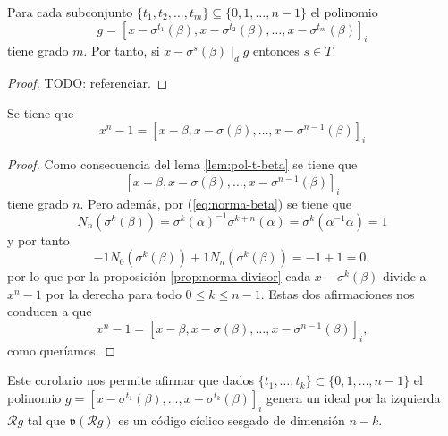 \begin{lemma}
  \label{lem:pol-t-beta}
  Para cada subconjunto \(\{t_1, t_2, \dots, t_m\} \subseteq \{0, 1, \dots, n - 1\}\) el polinomio 
  \[
    g = \left[x - \sigma^{t_1}(\beta), x - \sigma^{t_{2}}(\beta), \dots, x - \sigma^{t_m}(\beta)\right]_{i}
  \]
  tiene grado \(m\).
  Por tanto, si \(x - \sigma^s(\beta) \mid_d g\) entonces \(s \in T\).
\end{lemma}

\begin{proof}
  TODO: referenciar.
\end{proof}

\begin{corollary}
  Se tiene que
  \[
  x^n - 1 = \left[x - \beta, x - \sigma(\beta), \dots, x - \sigma^{n-1}(\beta)\right]_i
  \]
\end{corollary}

\begin{proof}
  Como consecuencia del lema \ref{lem:pol-t-beta} se tiene que 
  \[
    \left[x - \beta, x - \sigma(\beta), \dots, x - \sigma^{n-1}(\beta)\right]_i
  \]
  tiene grado \(n\).
  Pero además, por (\ref{eq:norma-beta}) se tiene que
  \[
  N_n(\sigma^k(\beta)) = \sigma^k(\alpha)^{-1}\sigma^{k+n}(\alpha) = \sigma^k(\alpha^{-1}\alpha) = 1
  \]
  y por tanto 
  \[
    -1N_0(\sigma^k(\beta)) + 1N_n(\sigma^k(\beta)) = -1 + 1 = 0,
  \]
  por lo que por la proposición \ref{prop:norma-divisor} cada \(x - \sigma^k(\beta)\) divide a \(x^n -1\) por la derecha para todo \(0 \leq k \leq n -1\).
  Estas dos afirmaciones nos conducen a que 
  \[
  x^n - 1 = \left[x - \beta, x - \sigma(\beta), \dots, x - \sigma^{n-1}(\beta)\right]_i,
  \]
  como queríamos. 
\end{proof}

Este corolario nos permite afirmar que dados \(\{t_1, \dots, t_k\} \subset \{0, 1, \dots, n - 1\}\) el polinomio \(g = [x - \sigma^{t_1}(\beta), \dots, x - \sigma^{t_k}(\beta)]_i\) genera un ideal por la izquierda \(\mathcal Rg\) tal que \(\mathfrak v(\mathcal Rg)\) es un código cíclico sesgado de dimensión \(n - k\).

